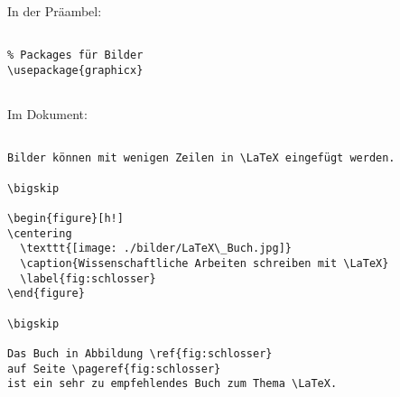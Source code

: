 
In der Präambel:

\begin{verbatim}

% Packages für Bilder
\usepackage{graphicx}


\end{verbatim}

\tcblower

Im Dokument: 

\begin{verbatim}

Bilder können mit wenigen Zeilen in \LaTeX eingefügt werden. 

\bigskip 

\begin{figure}[h!]
\centering
  \texttt{[image: ./bilder/LaTeX\_Buch.jpg]}
  \caption{Wissenschaftliche Arbeiten schreiben mit \LaTeX}
  \label{fig:schlosser}
\end{figure}

\bigskip 

Das Buch in Abbildung \ref{fig:schlosser} 
auf Seite \pageref{fig:schlosser} 
ist ein sehr zu empfehlendes Buch zum Thema \LaTeX. 

\end{verbatim}
